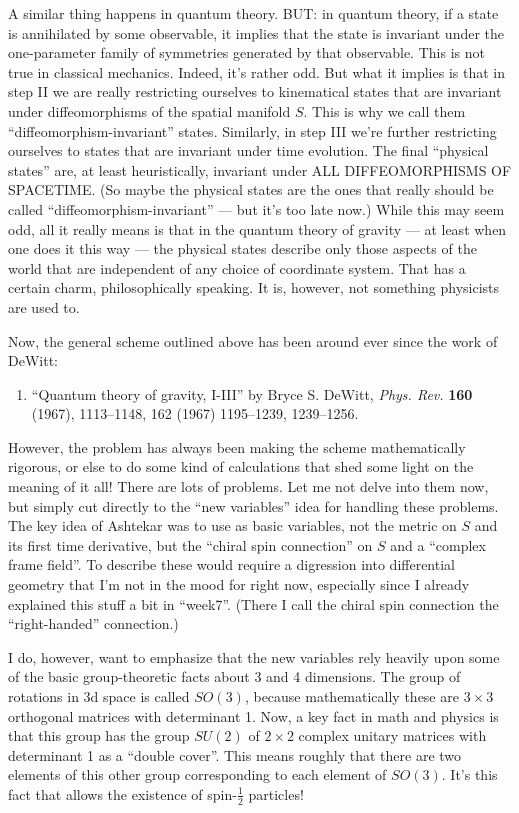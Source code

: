 \documentclass{article}
\def\tightlist{}
\begin{document}
A similar thing happens in quantum theory. BUT: in quantum theory, if a
state is annihilated by some observable, it implies that the state is
invariant under the one-parameter family of symmetries generated by that
observable. This is not true in classical mechanics. Indeed, it's rather
odd. But what it implies is that in step II we are really restricting
ourselves to kinematical states that are invariant under diffeomorphisms
of the spatial manifold \(S\). This is why we call them
``diffeomorphism-invariant'' states. Similarly, in step III we're
further restricting ourselves to states that are invariant under time
evolution. The final ``physical states'' are, at least heuristically,
invariant under ALL DIFFEOMORPHISMS OF SPACETIME. (So maybe the physical
states are the ones that really should be called
``diffeomorphism-invariant'' --- but it's too late now.) While this may
seem odd, all it really means is that in the quantum theory of gravity
--- at least when one does it this way --- the physical states describe
only those aspects of the world that are independent of any choice of
coordinate system. That has a certain charm, philosophically speaking.
It is, however, not something physicists are used to.

Now, the general scheme outlined above has been around ever since the
work of DeWitt:

\begin{enumerate}
\def\labelenumi{\arabic{enumi})}
\tightlist
\item
  ``Quantum theory of gravity, I-III'' by Bryce S. DeWitt, \emph{Phys.
  Rev.} \textbf{160} (1967), 1113--1148, 162 (1967) 1195--1239,
  1239--1256.
\end{enumerate}

However, the problem has always been making the scheme mathematically
rigorous, or else to do some kind of calculations that shed some light
on the meaning of it all! There are lots of problems. Let me not delve
into them now, but simply cut directly to the ``new variables'' idea for
handling these problems. The key idea of Ashtekar was to use as basic
variables, not the metric on \(S\) and its first time derivative, but
the ``chiral spin connection'' on \(S\) and a ``complex frame field''.
To describe these would require a digression into differential geometry
that I'm not in the mood for right now, especially since I already
explained this stuff a bit in ``week7''. (There I call the chiral spin
connection the ``right-handed'' connection.)

I do, however, want to emphasize that the new variables rely heavily
upon some of the basic group-theoretic facts about 3 and 4 dimensions.
The group of rotations in 3d space is called \(SO(3)\), because
mathematically these are \(3\times3\) orthogonal matrices with
determinant 1. Now, a key fact in math and physics is that this group
has the group \(SU(2)\) of \(2\times2\) complex unitary matrices with
determinant 1 as a ``double cover''. This means roughly that there are
two elements of this other group corresponding to each element of
\(SO(3)\). It's this fact that allows the existence of spin-\(\frac12\)
particles!
\end{document}
